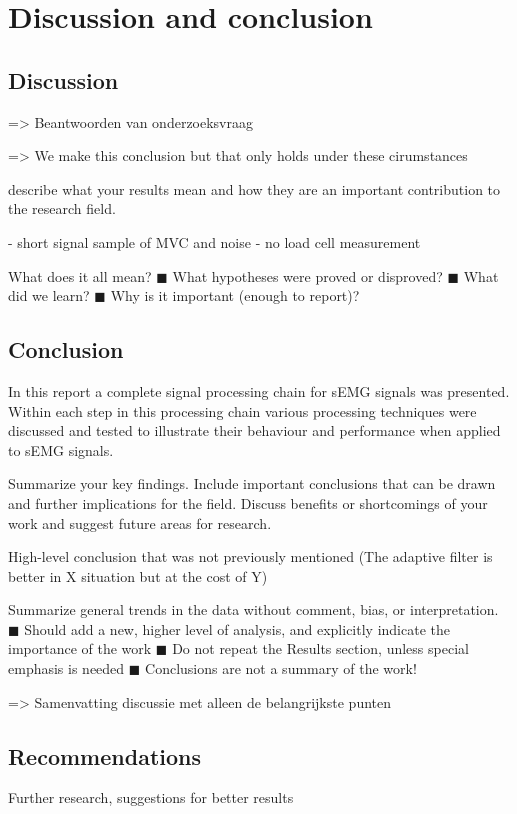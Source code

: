 \chapter{Discussion and conclusion}
\section{Discussion}
=> Beantwoorden van onderzoeksvraag

=> We make this conclusion but that only holds under these cirumstances

describe what your results mean and how they are an important contribution to the research field.

- short signal sample of MVC and noise
- no load cell measurement


What does it all mean?
◼ What hypotheses were proved or disproved?
◼ What did we learn?
◼ Why is it important (enough to report)?
\section{Conclusion}
In this report a complete signal processing chain for sEMG signals was presented. Within each step in this processing chain various processing techniques were discussed and tested to illustrate their behaviour and performance when applied to sEMG signals. 



Summarize your key findings. Include important conclusions that can be drawn and further implications for the field. Discuss benefits or shortcomings of your work and suggest future areas for research.

High-level conclusion that was not previously mentioned (The adaptive filter is better in X situation but at the cost of Y)

Summarize general trends in the data without comment, bias, or interpretation.
◼ Should add a new, higher level of analysis, and explicitly indicate the importance
of the work
◼ Do not repeat the Results section, unless special emphasis is needed
◼ Conclusions are not a summary of the work!

=> Samenvatting discussie met alleen de belangrijkste punten

\section{Recommendations}
Further research, suggestions for better results
